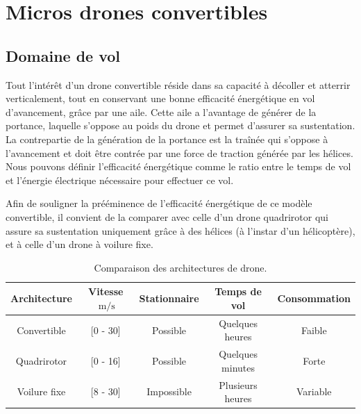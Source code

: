 \section{Micros drones convertibles}

    \subsection{Domaine de vol} 
    Tout l'intérêt d'un drone convertible réside dans sa capacité à décoller et atterrir verticalement, tout en conservant une bonne efficacité énergétique en vol d'avancement, grâce par une aile. Cette aile a l'avantage de générer de la portance, laquelle s'oppose au poids du drone et permet d'assurer sa sustentation. La contrepartie de la génération de la portance est la traînée qui s'oppose à l'avancement et doit être contrée par une force de traction générée par les hélices. Nous pouvons définir l'efficacité énergétique comme le ratio entre le temps de vol et l'énergie électrique nécessaire pour effectuer ce vol.
    
    Afin de souligner la prééminence de l'efficacité énergétique de ce modèle convertible, il convient de la comparer avec celle d'un drone quadrirotor qui assure sa sustentation uniquement grâce à des hélices (à l'instar d'un hélicoptère), et à celle d'un drone à voilure fixe.
    \begin{table}[ht]
        \centering
        \begin{tabular}{|c|c|c|c|c|}
            \hline
            Architecture & Vitesse $\SI{}{\meter\per\second}$  & Stationnaire & Temps de vol & Consommation\\
            \hline \hline
            Convertible & [0 - 30] & Possible & Quelques heures & Faible\\
            \hline
            Quadrirotor & [0 - 16] & Possible& Quelques minutes & Forte\\
            \hline
            Voilure fixe & [8 - 30] & Impossible & Plusieurs heures & Variable \\
            \hline
        \end{tabular}
        \caption{Comparaison des architectures de drone.}
    \end{table}

